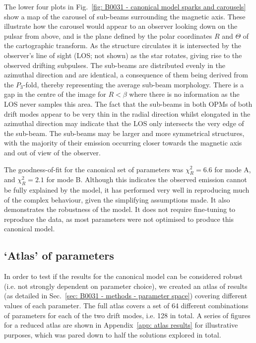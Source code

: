 The lower four plots in Fig.~\ref{fig: B0031 - canonical model sparks and carousels} show a map of the carousel of sub-beams surrounding the magnetic axis. These illustrate how the carousel would appear to an observer looking down on the pulsar from above, and is the plane defined by the polar coordinates $R$ and $\Theta$ of the cartographic transform. As the structure circulates it is intersected by the observer's line of sight (LOS; not shown) as the star rotates, giving rise to the observed drifting subpulses. The sub-beams are distributed evenly in the azimuthal direction and are identical, a consequence of them being derived from the $P_3$-fold, thereby representing the average sub-beam morphology. There is a gap in the centre of the image for $R<\beta$ where there is no information as the LOS never samples this area. The fact that the sub-beams in both OPMs of both drift modes appear to be very thin in the radial direction whilst elongated in the azimuthal direction may indicate that the LOS only intersects the very edge of the sub-beam. The sub-beams may be larger and more symmetrical structures, with the majority of their emission occurring closer towards the magnetic axis and out of view of the observer.

The goodness-of-fit for the canonical set of parameters was $\chi^2_R = 6.6$ for mode A, and $\chi^2_R = 2.1$ for mode B. Although this indicates the observed emission cannot be fully explained by the model, it has performed very well in reproducing much of the complex behaviour, given the simplifying assumptions made. It also demonstrates the robustness of the model. It does not require fine-tuning to reproduce the data, as most parameters were not optimised to produce this canonical model.












\subsection{`Atlas' of parameters}
\label{sec: B0031 - results - atlas}

In order to test if the results for the canonical model can be considered robust (i.e. not strongly dependent on parameter choice), we created an atlas of results (as detailed in Sec.~\ref{sec: B0031 - methods - parameter space}) covering different values of each parameter. The full atlas covers a set of 64 different combinations of parameters for each of the two drift modes, i.e. 128 in total. A series of figures for a reduced atlas are shown in Appendix~\ref{app: atlas results} for illustrative purposes, which was pared down to half the solutions explored in total.

